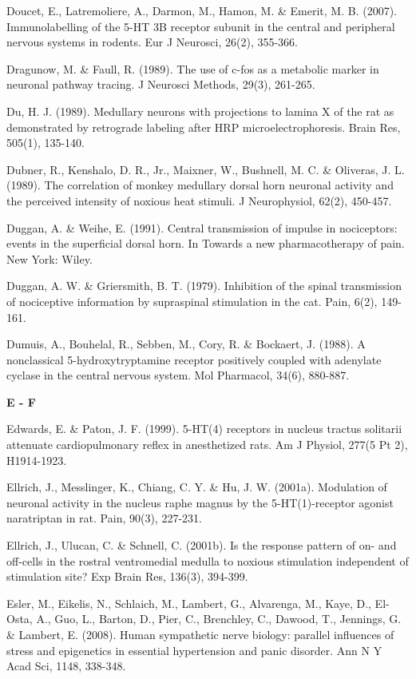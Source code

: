 \documentclass[a4paper,12pt,twoside]{report}
\begin{document}
\begin{singlespacing}
\begin{footnotesize}
Doucet, E., Latremoliere, A., Darmon, M., Hamon, M. \& Emerit, M. B. (2007). Immunolabelling of the 5-HT 3B receptor subunit in the central and peripheral nervous systems in rodents. Eur J Neurosci, 26(2), 355-366.

Dragunow, M. \& Faull, R. (1989). The use of c-fos as a metabolic marker in neuronal pathway tracing. J Neurosci Methods, 29(3), 261-265.

Du, H. J. (1989). Medullary neurons with projections to lamina X of the rat as demonstrated by retrograde labeling after HRP microelectrophoresis. Brain Res, 505(1), 135-140.

Dubner, R., Kenshalo, D. R., Jr., Maixner, W., Bushnell, M. C. \& Oliveras, J. L. (1989). The correlation of monkey medullary dorsal horn neuronal activity and the perceived intensity of noxious heat stimuli. J Neurophysiol, 62(2), 450-457.

Duggan, A. \& Weihe, E. (1991). Central transmission of impulse in nociceptors: events in the superficial dorsal horn. In Towards a new pharmacotherapy of pain. New York: Wiley.

Duggan, A. W. \& Griersmith, B. T. (1979). Inhibition of the spinal transmission of nociceptive information by supraspinal stimulation in the cat. Pain, 6(2), 149-161.

Dumuis, A., Bouhelal, R., Sebben, M., Cory, R. \& Bockaert, J. (1988). A nonclassical 5-hydroxytryptamine receptor positively coupled with adenylate cyclase in the central nervous system. Mol Pharmacol, 34(6), 880-887.

\medskip
\begin{Large}\textbf{E - F}\end{Large}

Edwards, E. \& Paton, J. F. (1999). 5-HT(4) receptors in nucleus tractus solitarii attenuate cardiopulmonary reflex in anesthetized rats. Am J Physiol, 277(5 Pt 2), H1914-1923.

Ellrich, J., Messlinger, K., Chiang, C. Y. \& Hu, J. W. (2001a). Modulation of neuronal activity in the nucleus raphe magnus by the 5-HT(1)-receptor agonist naratriptan in rat. Pain, 90(3), 227-231.

Ellrich, J., Ulucan, C. \& Schnell, C. (2001b). Is the response pattern of on- and off-cells in the rostral ventromedial medulla to noxious stimulation independent of stimulation site? Exp Brain Res, 136(3), 394-399.

Esler, M., Eikelis, N., Schlaich, M., Lambert, G., Alvarenga, M., Kaye, D., El-Osta, A., Guo, L., Barton, D., Pier, C., Brenchley, C., Dawood, T., Jennings, G. \& Lambert, E. (2008). Human sympathetic nerve biology: parallel influences of stress and epigenetics in essential hypertension and panic disorder. Ann N Y Acad Sci, 1148, 338-348.


\end{footnotesize}
\end{singlespacing}
\end{document}
